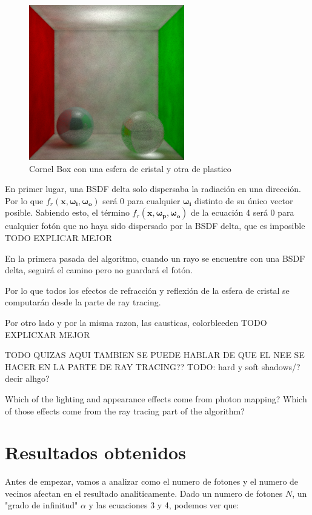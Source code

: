 \documentclass{article}
\begin{document}
\begin{figure}[H]
\centering
\includegraphics[width=0.6\linewidth]{imgs/pm_delta1.png}
\caption{Cornel Box con una esfera de cristal y otra de plastico}
\end{figure}

En primer lugar, una BSDF delta solo dispersaba la radiación en una dirección.
Por lo que \(f_r(\mathbf{x}, \mathbf{\omega_{i}}, \mathbf{\omega_{o}})\) será 0
para cualquier \(\mathbf{\omega_{i}}\) distinto de su único vector posible.
Sabiendo esto, el término
\( f_r(\mathbf{x}, \mathbf{\omega_{p}}, \mathbf{\omega_{o}}) \) de la ecuación 4
será 0 para cualquier fotón que no haya sido dispersado por la BSDF delta, que
es imposible TODO EXPLICAR MEJOR

En la primera pasada del algoritmo, cuando un rayo se encuentre con una BSDF
delta, seguirá el camino pero no guardará el fotón.

Por lo que todos los efectos de refracción y reflexión de la esfera de cristal
se computarán desde la parte de ray tracing.

Por otro lado y por la misma razon, las causticas, colorbleeden TODO EXPLICXAR MEJOR

TODO QUIZAS AQUI TAMBIEN SE PUEDE HABLAR DE QUE EL NEE SE HACER EN LA PARTE DE RAY TRACING?? TODO: hard y soft shadows/? decir alhgo?

Which of the lighting and appearance effects come from photon mapping? Which of those effects come
from the ray tracing part of the algorithm?

\section{Resultados obtenidos}

Antes de empezar, vamos a analizar como el numero de fotones y el numero de vecinos afectan en el resultado analiticamente.
Dado un numero de fotones \(N\), un "grado de infinitud" \(\alpha\) y las ecuaciones 3 y 4, podemos ver que:
\end{document}

